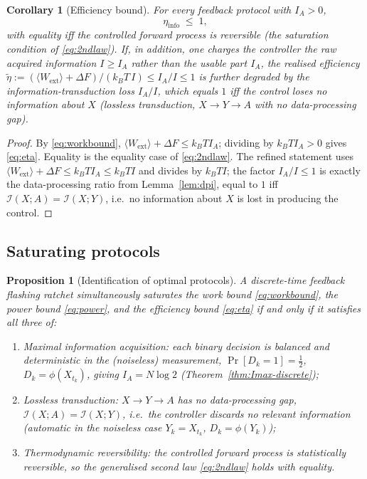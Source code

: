 \documentclass{amsart}
\newtheorem{proposition}{Proposition}
\newtheorem{corollary}{Corollary}
\theoremstyle{definition}
\newcommand{\kB}{k_{B}}
\newcommand{\Wext}{\langle W_{\mathrm{ext}}\rangle}
\begin{document}
\begin{corollary}[Efficiency bound]\label{cor:eff}
For every feedback protocol with $I_A>0$,
\begin{equation}\label{eq:eta}
\eta_{\mathrm{info}} \;\le\; 1,
\end{equation}
with equality iff the controlled forward process is reversible (the saturation
condition of \eqref{eq:2ndlaw}). If, in addition, one charges the controller
the raw acquired information $I\ge I_A$ rather than the usable part $I_A$, the
realised efficiency
$\tilde\eta:=(\Wext+\Delta F)/(\kB T\,I)\le I_A/I\le1$ is further degraded by
the information-transduction loss $I_A/I$, which equals $1$ iff the control
loses no information about $X$ (lossless transduction, $X\to Y\to A$ with no
data-processing gap).
\end{corollary}

\begin{proof}
By \eqref{eq:workbound}, $\Wext+\Delta F\le \kB T I_A$; dividing by
$\kB T I_A>0$ gives \eqref{eq:eta}. Equality is the equality case of
\eqref{eq:2ndlaw}. The refined statement uses $\Wext+\Delta F\le\kB T I_A\le
\kB T I$ and divides by $\kB T I$; the factor $I_A/I\le1$ is exactly the
data-processing ratio from Lemma~\ref{lem:dpi}, equal to $1$ iff
$\mathcal I(X;A)=\mathcal I(X;Y)$, i.e.\ no information about $X$ is lost in
producing the control.
\end{proof}

\subsection{Saturating protocols}

\begin{proposition}[Identification of optimal protocols]\label{prop:opt}
A discrete-time feedback flashing ratchet simultaneously saturates the
work bound \eqref{eq:workbound}, the power bound \eqref{eq:power}, and the
efficiency bound \eqref{eq:eta} if and only if it satisfies all three of:
\begin{enumerate}
\item[\textup{(i)}] \emph{Maximal information acquisition}: each binary decision is
balanced and deterministic in the (noiseless) measurement,
$\Pr[D_k=1]=\tfrac12$, $D_k=\phi(X_{t_k})$, giving $I_A=N\log2$
(Theorem~\ref{thm:Imax-discrete});
\item[\textup{(ii)}] \emph{Lossless transduction}: $X\to Y\to A$ has no
data-processing gap, $\mathcal I(X;A)=\mathcal I(X;Y)$, i.e.\ the controller
discards no relevant information (automatic in the noiseless case
$Y_k=X_{t_k}$, $D_k=\phi(Y_k)$);
\item[\textup{(iii)}] \emph{Thermodynamic reversibility}: the controlled forward
process is statistically reversible, so the generalised second law
\eqref{eq:2ndlaw} holds with equality.
\end{enumerate}
\end{proposition}
\end{document}
